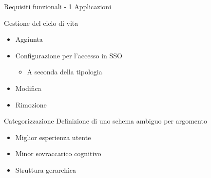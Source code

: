 \begin{tframe}{Requisiti funzionali - 1 \newline \mbox{} \hfill Applicazioni}
\begin{block}{Gestione del ciclo di vita}
{\fontsize{10pt}{7.2}\selectfont
\begin{itemize} 
\item Aggiunta
\item Configurazione per l'accesso in SSO
	\begin{itemize}
	\item A seconda della tipologia
	\end{itemize}
\item Modifica
\item Rimozione
\end{itemize}
}
\end{block}

\begin{block}{Categorizzazione}
Definizione di uno schema ambiguo per argomento
{\fontsize{10pt}{7.2}\selectfont
\begin{itemize}
\item Miglior esperienza utente
\item Minor sovraccarico cognitivo
\item Struttura gerarchica
\end{itemize}
}
\end{block}
\end{tframe}